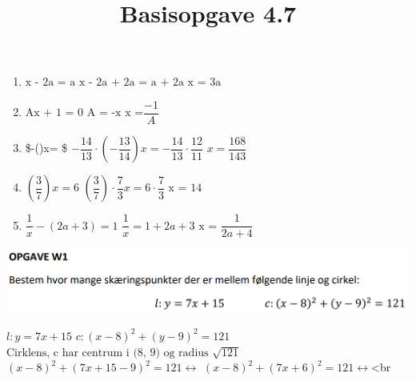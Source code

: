 \documentclass[
  a4paper,
]{article}
\title{Basisopgave 4.7}
\author{}
\date{}
\begin{document}
\maketitle
\thispagestyle{fancy}

\ifdefined\Shaded\renewenvironment{Shaded}{\begin{tcolorbox}[sharp corners, interior hidden, borderline west={3pt}{0pt}{shadecolor}, enhanced, frame hidden, breakable, boxrule=0pt]}{\end{tcolorbox}}\fi

\begin{enumerate}
\def\labelenumi{\arabic{enumi}.}
\item
  \(\text{x - 2a = a}\) \(\text{x - 2a + 2a = a + 2a}\)
  \(\text{x = 3a}\)
\item
  \(\text{Ax + 1 = 0}\) \(\text{A = -x}\) \(\text{x =}\dfrac{-1}{A}\)
\item
  \$-()x= \$
  \(-\dfrac{14}{13} \cdot (-\dfrac{13}{14}) x = -\dfrac{14}{13} \cdot \dfrac{12}{11}\)
  \(x = \dfrac{168}{143}\)
\item
  \((\dfrac{3}{7})x = 6\)
  \((\dfrac{3}{7}) \cdot \dfrac{7}{3}x = 6 \cdot \dfrac{7}{3}\)
  \(\text{x = 14}\)
\item
  \(\dfrac{1}{x}-(2a+3)=1\) \(\dfrac{1}{x} = 1 + 2a + 3\)
  \(\text{x = } \dfrac{1}{2a+4}\)
\end{enumerate}

\includegraphics{17-1-2024_files/figure-pdf/dad7beb7-1-image.png}

\(l: y = 7x + 15\) \(c: (x - 8)^2 + (y - 9)^2 = 121\)
\(\text{Cirklens, c har centrum i (8, 9) og radius } \sqrt{121}\)
\((x - 8)^2 + (7x+15-9)^2 = 121 \leftrightarrow\)
\((x - 8)^2 + (7x+6)^2 = 121 \leftrightarrow\)\textless br
\end{document}
